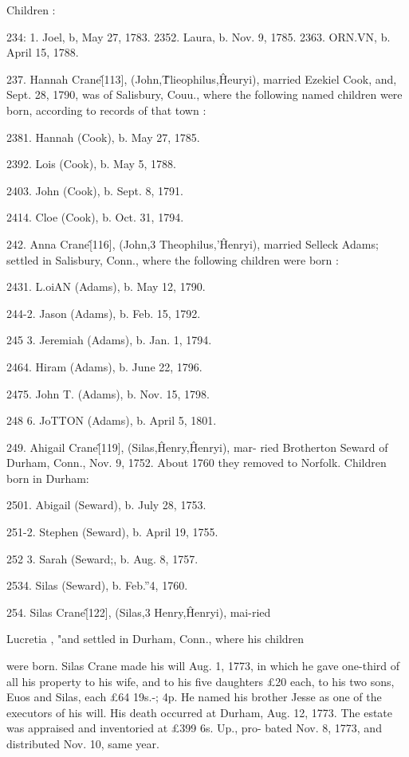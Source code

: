 \documentclass{book}
\begin{document}
Children : 

234: 1. Joel, b, May 27, 1783. 
2352. Laura, b. Nov. 9, 1785. 
2363. ORN.VN, b. April 15, 1788. 

237. Hannah Crane\^ [113], (John,\^ Tlieophilus,\^ Heuryi), 
married Ezekiel Cook, and, Sept. 28, 1790, was of Salisbury, 
Couu., where the following named children were born, according 
to records of that town : 

2381. Hannah (Cook), b. May 27, 1785. 

2392. Lois (Cook), b. May 5, 1788. 

2403. John (Cook), b. Sept. 8, 1791. 

2414. Cloe (Cook), b. Oct. 31, 1794. 

242. Anna Crane\^ [116], (John,3 Theophilus,'\^ Henryi), 
married Selleck Adams; settled in Salisbury, Conn., where the 
following children were born : 

2431. L.oiAN (Adams), b. May 12, 1790. 

244-2. Jason (Adams), b. Feb. 15, 1792. 

245  3. Jeremiah (Adams), b. Jan. 1, 1794. 

2464. Hiram (Adams), b. June 22, 1796. 

2475. John T. (Adams), b. Nov. 15, 1798. 

248  6. JoTTON (Adams), b. April 5, 1801. 

249. Ahigail Crane\^ [119], (Silas,\^ Henry,\^ Henryi), mar- 
ried Brotherton Seward of Durham, Conn., Nov. 9, 1752. About 
1760 they removed to Norfolk. Children born in Durham: 

2501. Abigail (Seward), b. July 28, 1753. 

251-2. Stephen (Seward), b. April 19, 1755. 

252  3. Sarah (Seward;, b. Aug. 8, 1757. 

2534. Silas (Seward), b. Feb.''4, 1760. 

254. Silas Crane\^ [122], (Silas,3 Henry,\^ Henryi), mai-ried 

Lucretia , "and settled in Durham, Conn., where his children 

were born. Silas Crane made his will Aug. 1, 1773, in which he 
gave one-third of all his property to his wife, and to his five 
daughters £20 each, to his two sons, Euos and Silas, each £64  
19s.-; 4p. He named his brother Jesse as one of the executors 
of his will. His death occurred at Durham, Aug. 12, 1773. The 
estate was appraised and inventoried at £399  6s.  Up., pro- 
bated Nov. 8, 1773, and distributed Nov. 10, same year. 
\end{document}
